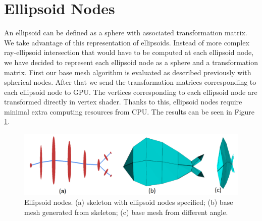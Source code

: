\section{Ellipsoid Nodes}
An ellipsoid can be defined as a sphere with associated transformation matrix.
We take advantage of this representation of ellipsoids.
Instead of more complex ray-ellipsoid intersection that would have to be computed at each ellipsoid node, we have decided to represent each ellipsoid node as a sphere and a transformation matrix.
First our base mesh algorithm is evaluated as described previously with spherical nodes.
After that we send the transformation matrices corresponding to each ellipsoid node to GPU.
The vertices corresponding to each ellipsoid node are transformed directly in vertex shader.
Thanks to this, ellipsoid nodes require minimal extra computing resources from CPU.
The results can be seen in Figure \ref{fig:ellipsoid_ilu}.

\begin{figure}[ht]
    \centering
    \includegraphics[width=\linewidth]{images/ellipsoid_fish_ilu}
    \caption[Ellipsoid nodes]{Ellipsoid nodes. (a) skeleton with ellipsoid nodes specified; (b) base mesh generated from skeleton; (c) base mesh from different angle.}
    \label{fig:ellipsoid_ilu}
\end{figure}

